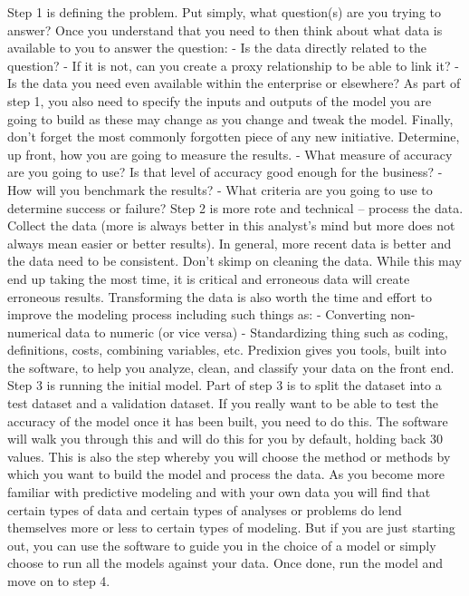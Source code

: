 Step 1 is defining the problem. Put simply, what question(s) are you trying to answer? Once you
understand that you need to then think about what data is available to you to answer the question:
- Is the data directly related to the question?
- If it is not, can you create a proxy relationship to be able to link it?
- Is the data you need even available within the enterprise or elsewhere?
As part of step 1, you also need to specify the inputs and outputs of the model you are going to build as
these may change as you change and tweak the model. Finally, don’t forget the most commonly
forgotten piece of any new initiative. Determine, up front, how you are going to measure the results.
- What measure of accuracy are you going to use? Is that level of accuracy good enough for
the business?
- How will you benchmark the results?
- What criteria are you going to use to determine success or failure?
Step 2 is more rote and technical – process the data. Collect the data (more is always better in this
analyst’s mind but more does not always mean easier or better results). In general, more recent data is
better and the data need to be consistent. Don’t skimp on cleaning the data. While this may end up
taking the most time, it is critical and erroneous data will create erroneous results. Transforming the
data is also worth the time and effort to improve the modeling process including such things as:
- Converting non-numerical data to numeric (or vice versa)
- Standardizing thing such as coding, definitions, costs, combining variables, etc.
Predixion gives you tools, built into the software, to help you analyze, clean, and classify your data on
the front end.
Step 3 is running the initial model. Part of step 3 is to split the dataset into a test dataset and a
validation dataset. If you really want to be able to test the accuracy of the model once it has been built,
you need to do this. The software will walk you through this and will do this for you by default, holding
back 30%
values. This is also the step whereby you will choose the method or methods by which you want to
build the model and process the data. As you become more familiar with predictive modeling and with
your own data you will find that certain types of data and certain types of analyses or problems do lend
themselves more or less to certain types of modeling. But if you are just starting out, you can use the
software to guide you in the choice of a model or simply choose to run all the models against your data.
Once done, run the model and move on to step 4.


